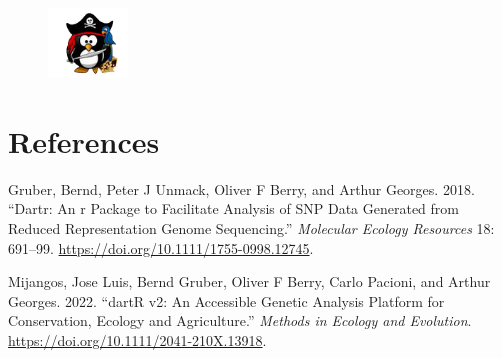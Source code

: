 \documentclass[
  letterpaper,
  DIV=11,
  numbers=noendperiod]{scrreprt}
\newlength{\cslhangindent}
\newlength{\cslentryspacingunit} %
\newenvironment{CSLReferences}[2] %
 {%
  \setlength{\parindent}{0pt}
  \ifodd #1
  \let\oldpar\par
  \def\par{\hangindent=\cslhangindent\oldpar}
  \fi
  \setlength{\parskip}{#2\cslentryspacingunit}
 }%
 {}
\begin{document}
\begin{figure}

{\centering \includegraphics[width=0.83333in,height=\textheight]{images/pirat.png}

}

\end{figure}


\hypertarget{references}{%
\chapter*{References}\label{references}}


\hypertarget{refs}{}
\begin{CSLReferences}{1}{0}
\leavevmode{}%
Gruber, Bernd, Peter J Unmack, Oliver F Berry, and Arthur Georges. 2018.
{``Dartr: An r Package to Facilitate Analysis of SNP Data Generated from
Reduced Representation Genome Sequencing.''} \emph{Molecular Ecology
Resources} 18: 691--99. \url{https://doi.org/10.1111/1755-0998.12745}.

\leavevmode{}%
Mijangos, Jose Luis, Bernd Gruber, Oliver F Berry, Carlo Pacioni, and
Arthur Georges. 2022. {``{dartR v2}: An Accessible Genetic Analysis
Platform for Conservation, Ecology and Agriculture.''} \emph{Methods in
Ecology and Evolution}. \url{https://doi.org/10.1111/2041-210X.13918}.

\end{CSLReferences}
\end{document}
